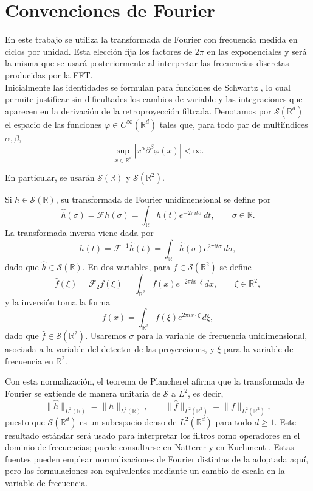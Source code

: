\section{Convenciones de Fourier}
\label{FourierConventions}

En este trabajo se utiliza la transformada de Fourier con frecuencia medida en ciclos por unidad. Esta elección fija los factores de $2\pi$ en las exponenciales y será la misma que se usará posteriormente al interpretar las frecuencias discretas producidas por la FFT.\\

Inicialmente las identidades se formulan para funciones de Schwartz \cite[Ap.~B.8]{kuchment2014}, lo cual permite justificar sin dificultades los cambios de variable y las integraciones que aparecen en la derivación de la retroproyección filtrada. Denotamos por $\mathcal{S}(\mathbb{R}^{d})$ el espacio de las funciones $\varphi\in C^{\infty}(\mathbb{R}^{d})$ tales que, para todo par de multiíndices $\alpha,\beta$,
\[
\sup_{x\in\mathbb{R}^{d}}\left|x^{\alpha}\partial^{\beta}\varphi(x)\right|<\infty.
\]

En particular, se usarán $\mathcal{S}(\mathbb{R})$ y $\mathcal{S}(\mathbb{R}^{2})$.

Si $h\in \mathcal{S}(\mathbb{R})$, su transformada de Fourier unidimensional se define por
\[
\widehat h(\sigma)
=
\mathcal{F}h(\sigma)
=
\int_{\mathbb{R}} h(t)e^{-2\pi i t\sigma}\,dt,
\qquad \sigma\in\mathbb{R}.
\]
La transformada inversa viene dada por
\[
h(t)
=
\mathcal{F}^{-1}\widehat h(t)
=
\int_{\mathbb{R}} \widehat h(\sigma)e^{2\pi i t\sigma}\,d\sigma,
\]
dado que $\widehat h\in\mathcal{S}(\mathbb R)$.
En dos variables, para $f\in \mathcal{S}(\mathbb{R}^{2})$ se define
\[
\widehat f(\xi)
=
\mathcal{F}_{2}f(\xi)
=
\int_{\mathbb{R}^{2}} f(x)e^{-2\pi i x\cdot \xi}\,dx,
\qquad \xi\in\mathbb{R}^{2},
\]
y la inversión toma la forma
\[
f(x)
=
\int_{\mathbb{R}^{2}} \widehat f(\xi)e^{2\pi i x\cdot \xi}\,d\xi,
\]
dado que $\widehat f\in\mathcal{S}(\mathbb R^2)$.
Usaremos $\sigma$ para la variable de frecuencia unidimensional, asociada a la variable del detector de las proyecciones, y $\xi$ para la variable de frecuencia en $\mathbb{R}^{2}$.

Con esta normalización, el teorema de Plancherel \cite[Ap.~B.8]{kuchment2014} afirma que la transformada de Fourier se extiende de manera unitaria de $\mathcal{S}$ a $L^{2}$, es decir,
\[
\|\widehat h\|_{L^{2}(\mathbb{R})}=\|h\|_{L^{2}(\mathbb{R})},
\qquad
\|\widehat f\|_{L^{2}(\mathbb{R}^{2})}=\|f\|_{L^{2}(\mathbb{R}^{2})},
\]
puesto que $\mathcal{S}(\mathbb R^d)$ es un subespacio denso de $L^2(\mathbb R^d)$ para todo $d\geq 1$.
Este resultado estándar será usado para interpretar los filtros como operadores en el dominio de frecuencias; puede consultarse en Natterer \cite[Sec.~VII.1]{natterer2001} y en Kuchment \cite[Ap.~B.8]{kuchment2014}. Estas fuentes pueden emplear normalizaciones de Fourier distintas de la adoptada aquí, pero las formulaciones son equivalentes mediante un cambio de escala en la variable de frecuencia.\\

